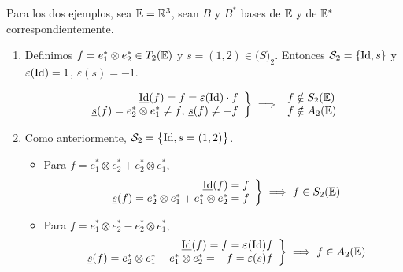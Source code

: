 \begin{example}
   Para los dos ejemplos, sea $\mathbb{E} = \mathbb{R}^3$, sean $B$ y $B^\ast$ bases de $\mathbb{E}$
   y de $\mathbb{E}^\ast$ correspondientemente.
    \begin{enumerate}
        \item
            Definimos $f = e_1^\ast \otimes e_2^\ast \in T_2(\mathbb{E})$
            y $s = (1,2) \in \mathcal(S)_2$. Entonces
            $\mathcal{S}_2 = \left\{\operatorname{Id}, s\right\}$ y $\varepsilon(\operatorname{Id}) = 1$,
            $\varepsilon(s) = -1$.

            \[
            \left.
                \begin{array}{r}
                    \underline{\operatorname{Id}}(f) = f = \varepsilon (\operatorname{Id}) \cdot f\\
                    \underline{s}(f) = e_2^\ast \otimes e_1^\ast \neq f\text{, }
                    \underline{s}(f)\neq -f
                \end{array}
            \right \}
            \implies
            \begin{array}{l}
                f \notin S _2(\mathbb{E})\\
                f \notin A_2(\mathbb{E})
            \end{array}
            \]
        \item
            Como anteriormente, $\mathcal{S}_2 = \left\{\operatorname{Id}, s = (1,2)\right\}$.
            \begin{itemize}
                \item
                    Para $f = e_1^\ast \otimes e_2^\ast + e_2^\ast \otimes e_1^\ast$,
                    \[
                        \left.
                        \begin{array}{r}
                            \underline{\operatorname{Id}}(f) = f\\
                            \underline{s}(f) = e_2^\ast \otimes e_1^\ast
                            + e_1^\ast \otimes e_2^\ast = f
                        \end{array}
                        \right \}
                        \implies
                        f \in S_2(\mathbb{E})
                    \]
                \item
                    Para $f = e_1^\ast \otimes e_2^\ast - e_2^\ast \otimes e_1^\ast$,
                    \[
                        \left.
                        \begin{array}{r}
                            \underline{\operatorname{Id}}(f) = f = \varepsilon(\operatorname{Id})f\\
                            \underline{s}(f) = e_2^\ast \otimes e_1^\ast
                            - e_1^\ast \otimes e_2^\ast = -f = \varepsilon(s)f
                        \end{array}
                        \right \}
                        \implies
                        f \in A_2(\mathbb{E})
                    \]
            \end{itemize}

    \end{enumerate}
\end{example}
